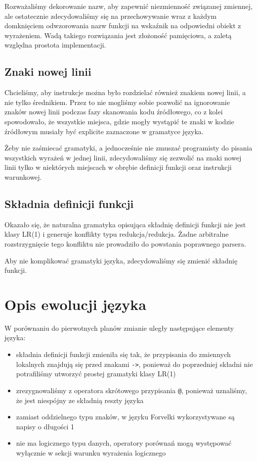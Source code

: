 \documentclass[4paper,10pt]{article}
\begin{document}
		Rozważaliśmy dekorowanie nazw, aby zapewnić niezmienność związanej zmiennej, ale ostatecznie zdecydowaliśmy się
		na przechowywanie wraz z każdym domknięciem odwzorowania nazw funkcji na wskaźnik na odpowiedni obiekt z wyrażeniem.
		Wadą takiego rozwiązania jest złożoność pamięciowa, a zaletą względna prostota implementacji.	
	
	\subsection{Znaki nowej linii}
		Chcieliśmy, aby instrukcje można było rozdzielać również znakiem nowej linii, a nie tylko średnikiem.
		Przez to nie mogliśmy sobie pozwolić na ignorowanie znaków nowej linii podczas fazy skanowania kodu źródłowego,
		co z kolei spowodowało, że wszystkie miejsca, gdzie mogły wystąpić te znaki w kodzie źródłowym
		musiały być explicite zaznaczone w gramatyce języka.

		Żeby nie zaśmiecać gramatyki, a jednocześnie nie zmuszać programisty do pisania wszystkich wyrażeń w jednej linii,
		zdecydowaliśmy się zezwolić na znaki nowej linii tylko w niektórych miejscach w obrębie definicji funkcji oraz instrukcji warunkowej.
		
	
	\subsection{Składnia definicji funkcji}
		Okazało się, że naturalna gramatyka opisująca składnię definicji funkcji nie jest klasy LR(1)
		i generuje konflikty typu redukcja/redukcja.
		Żadne arbitralne rozstrzygnięcie tego konfliktu nie prowadziło do powstania poprawnego parsera.

		Aby nie komplikować gramatyki języka, zdecydowaliśmy się zmienić składnię funkcji.

\section{Opis ewolucji języka}
	W porównaniu do pierwotnych planów zmianie uległy następujące elementy języka:
	\begin{itemize}
		\item składnia definicji funkcji zmieniła się tak, że przypisania do zmiennych lokalnych znajdują się przed znakami \texttt{->}, ponieważ do poprzedniej składni nie potrafiliśmy utworzyć prostej gramatyki klasy LR(1)
		\item zrezygnowaliśmy z operatora skrótowego przypisania \texttt{@}, ponieważ uznaliśmy, że jest niespójny ze składnią reszty języka
		\item zamiast oddzielnego typu znaków, w języku Forvelki wykorzystywane są napisy o długości 1
		\item nie ma logicznego typu danych, operatory porównań mogą występować wyłącznie w sekcji warunku wyrażenia logicznego
	\end{itemize}
\end{document}
